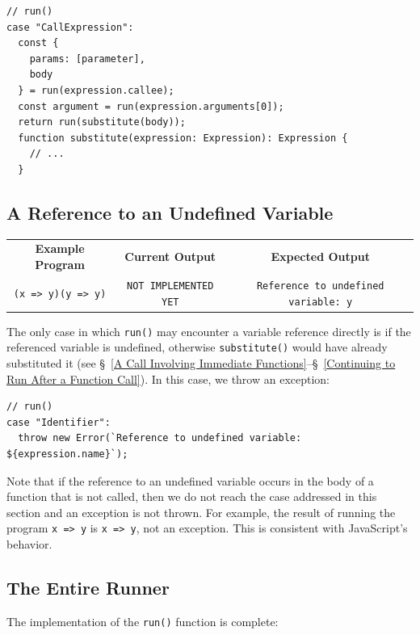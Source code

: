 \documentclass[12pt, oneside]{book}
\begin{document}
\begin{verbatim}
// run()
case "CallExpression":
  const {
    params: [parameter],
    body
  } = run(expression.callee);
  const argument = run(expression.arguments[0]);
  return run(substitute(body));
  function substitute(expression: Expression): Expression {
    // ...
  }
\end{verbatim}

\subsection{A Reference to an Undefined Variable}

\begin{center}
\begin{tabular}{c|c|c}
\textbf{Example Program} & \textbf{Current Output} & \textbf{Expected Output} \\
\texttt{(x => y)(y => y)} & \texttt{NOT IMPLEMENTED YET} & \texttt{Reference to undefined variable: y} \\
\end{tabular}
\end{center}

The only case in which \texttt{run()} may encounter a variable reference directly is if the referenced variable is undefined, otherwise \texttt{substitute()} would have already substituted it (see §~\ref{A Call Involving Immediate Functions}–§~\ref{Continuing to Run After a Function Call}). In this case, we throw an exception:

\begin{verbatim}
// run()
case "Identifier":
  throw new Error(`Reference to undefined variable: ${expression.name}`);
\end{verbatim}

Note that if the reference to an undefined variable occurs in the body of a function that is not called, then we do not reach the case addressed in this section and an exception is not thrown. For example, the result of running the program \texttt{x => y} is \texttt{x => y}, not an exception. This is consistent with JavaScript’s behavior.

\subsection{The Entire Runner}
\label{The Entire Runner}

The implementation of the \texttt{run()} function is complete:
\end{document}
